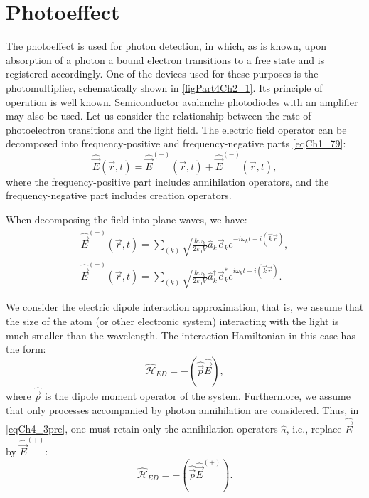 \section{Photoeffect}
The photoeffect is used for photon detection, in which, as is known, upon absorption of a photon a bound electron transitions to a free state and is registered accordingly. One of the devices used for these purposes is the photomultiplier, schematically shown in \autoref{figPart4Ch2_1}. Its principle of operation is well known. Semiconductor avalanche photodiodes with an amplifier may also be used. Let us consider the relationship between the rate of photoelectron transitions and the light field. The electric field operator can be decomposed into frequency-positive and frequency-negative parts \eqref{eqCh1_79}:
\begin{equation}
\hat{\vec{E}}\left(\vec{r}, t\right) = 
\hat{\vec{E}}^{(+)}\left(\vec{r}, t\right) +
\hat{\vec{E}}^{(-)}\left(\vec{r}, t\right),
\label{eqCh4_1}
\end{equation}
where the frequency-positive part includes annihilation operators, and the frequency-negative part includes creation operators.



When decomposing the field into plane waves, we have:
\begin{eqnarray}
\hat{\vec{E}}^{(+)}\left(\vec{r}, t\right) = \sum_{(k)} \sqrt{\frac{\hbar \omega_k}{2 \varepsilon_0
V}} \hat{a}_k \vec{e}_k e^{-i \omega_k t + i \left(\vec{k}\vec{r}
  \right)},
\nonumber \\
\hat{\vec{E}}^{(-)}\left(\vec{r}, t\right) = \sum_{(k)} \sqrt{\frac{\hbar \omega_k}{2 \varepsilon_0
V}} \hat{a}_k^{\dag} \vec{e}_k^{*} e^{i \omega_k t - i \left(\vec{k}\vec{r}
  \right)}.
\label{eqCh4_2}
\end{eqnarray}

We consider the electric dipole interaction approximation, that is, we assume that the size of the atom (or other electronic system) interacting with the light is much smaller than the wavelength. The interaction Hamiltonian in this case has the form:
\begin{equation}
\hat{\mathcal{H}}_{ED} = - \left(\hat{\vec{p}}\hat{\vec{E}}\right),
\label{eqCh4_3pre}
\end{equation}
where $\hat{\vec{p}}$ is the dipole moment operator of the system. 
Furthermore, we assume that only processes accompanied by photon annihilation are considered. Thus, in \eqref{eqCh4_3pre}, one must retain only the annihilation operators $\hat{a}$, i.e., replace $\hat{\vec{E}}$ by $\hat{\vec{E}}^{(+)}$:
\begin{equation}
\hat{\mathcal{H}}_{ED} = - \left(\hat{\vec{p}}\hat{\vec{E}}^{(+)}\right).
\label{eqCh4_3}
\end{equation}


